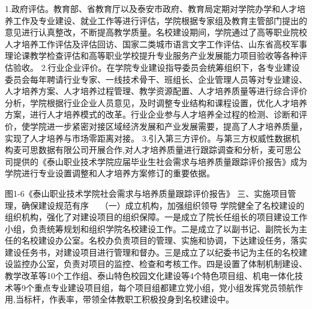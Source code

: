 1.政府评估。教育部、省教育厅以及泰安市政府、教育局定期对学院办学和人才培养工作及专业建设、就业工作等进行评估，学院根据专家组及教育主管部门提出的意见进行认真整改，不断提高教学质量。名校建设期间，学院通过了高等职业院校人才培养工作评估及评估回访、国家二类城市语言文字工作评估、山东省高校军事理论课教学检查评估和高等职业学校提升专业服务产业发展能力项目验收等各种评估验收。
2.行业企业评价。在学院专业建设指导委员会统筹组织下，各专业建设委员会每年聘请行业专家、一线技术骨干、班组长、企业管理人员等对专业建设、人才培养方案、人才培养过程管理、教学资源配置、人才培养质量等进行综合评价分析，学院根据行业企业人员意见，及时调整专业结构和课程设置，优化人才培养方案，进行人才培养模式的改革。行业企业参与人才培养全过程的检测、诊断和评价，使学院进一步紧密对接区域经济发展和产业发展需要，提高了人才培养质量，实现了人才培养与市场零距离对接。
3.引入第三方评价。与第三方权威性数据机构麦可思数据有限公司开展合作,对人才培养质量进行跟踪调查和分析，麦可思公司提供的《泰山职业技术学院应届毕业生社会需求与培养质量跟踪评价报告》成为学院进行专业设置调整和人才培养方案修订的重要依据。
      
图1-6《泰山职业技术学院社会需求与培养质量跟踪评价报告》
三、实施项目管理，确保建设规范有序　
（一）成立机构，加强组织领导
学院健全了名校建设的组织机构，强化了对建设项目的组织保障。一是成立了院长任组长的项目建设工作小组，负责统筹规划和组织学院名校建设工作。二是成立了以副书记、副院长为主任的名校建设办公室。名校办负责项目的管理、实施和协调，下达建设任务，落实建设任务书，对建设项目进行管理和督办。三是成立了以纪委书记为主任的名校建设监控办公室，负责对项目的监控、检查和考核工作。四是设置了体制机制建设、教学改革等10个工作组、泰山特色校园文化建设等4个特色项目组、机电一体化技术等9个重点专业建设项目组，每个项目组都建立党小组，党小组发挥党员领航作用,当标杆，作表率，带领全体教职工积极投身到名校建设中。
   
